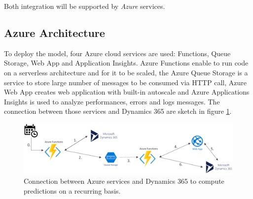 Both integration will be supported by \textit{Azure} services.

\subsection{Azure Architecture}
To deploy the model, four Azure cloud services are used: Functions, Queue Storage, Web App and Application Insights. Azure Functions enable to run code on a serverless architecture and for it to be scaled, the Azure Queue Storage is a service to store large number of messages to be consumed via HTTP call, Azure Web App creates web application with built-in autoscale and Azure Applications Insights is used to analyze performances, errors and logs messages. The connection between those services and Dynamics 365 are sketch in figure \ref{fig:azure-deployment}.

\begin{figure}[!h]
    \centering
    \includegraphics[width=12cm]{images/azure-archi-weekly.png}
    \caption[Deployment architecture for scheduled predictions]{Connection between Azure services and Dynamics 365 to compute predictions on a recurring basis.}
    \label{fig:azure-deployment}
\end{figure}

